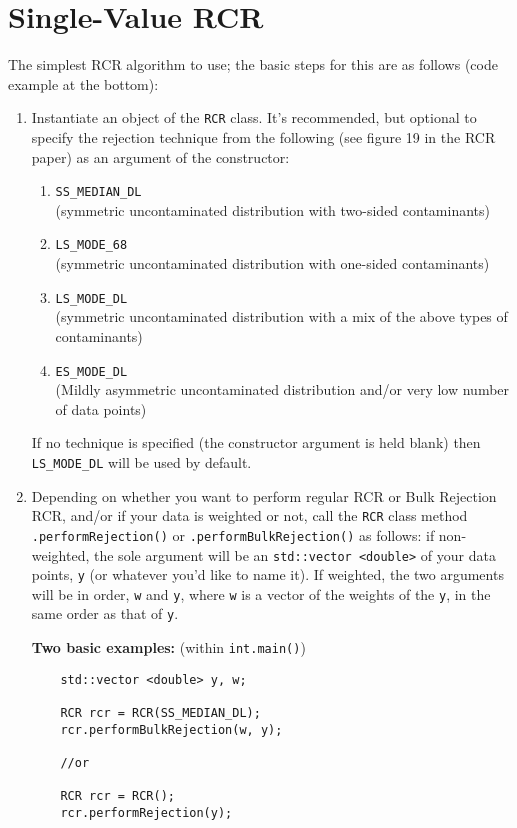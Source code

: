 \documentclass[12pt]{article}
\begin{document}
\section{Single-Value RCR}
The simplest RCR algorithm to use; the basic steps for this are as follows (code example at the bottom):
\begin{enumerate}
	\item Instantiate an object of the \texttt{RCR} class. It's recommended, but optional to specify the rejection technique from the following (see figure 19 in the RCR paper) as an argument of the constructor:
	\begin{enumerate}
		\item \texttt{SS\_MEDIAN\_DL} 
		\\(symmetric uncontaminated distribution with two-sided contaminants)
		\item \texttt{LS\_MODE\_68} 
		\\(symmetric uncontaminated distribution with one-sided contaminants)
		\item \texttt{LS\_MODE\_DL}
		\\(symmetric uncontaminated distribution with a mix of the above types of contaminants)
		\item \texttt{ES\_MODE\_DL}
		\\(Mildly asymmetric uncontaminated distribution and/or very low number of data points)
	\end{enumerate}
	If no technique is specified (the constructor argument is held blank) then \texttt{LS\_MODE\_DL} will be used by default.
	\item Depending on whether you want to perform regular RCR or Bulk Rejection RCR, and/or if your data is weighted or not, call the \texttt{RCR} class method \texttt{.performRejection()} or \texttt{.performBulkRejection()} as follows: if non-weighted, the sole argument will be an \texttt{std::vector <double>} of your data points,  \texttt{y} (or whatever you'd like to name it). If weighted, the two arguments will be in order, \texttt{w} and \texttt{y}, where \texttt{w} is a vector of the weights of the \texttt{y}, in the same order as that of \texttt{y}.
	
	\par \textbf{Two basic examples:} (within \texttt{int.main()})
	\begin{lstlisting}
	std::vector <double> y, w;
	
	RCR rcr = RCR(SS_MEDIAN_DL);
	rcr.performBulkRejection(w, y);
	
	//or
	
	RCR rcr = RCR();
	rcr.performRejection(y);
	\end{lstlisting}
	
\end{enumerate}
\end{document}
